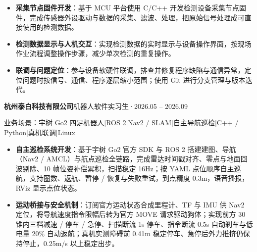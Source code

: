 \documentclass[10pt,a4paper]{article}
\begin{document}
\vspace{2pt}

\begin{itemize}[leftmargin=1.5em, itemsep=1pt, parsep=0pt, topsep=2pt]
    \item \textbf{采集节点固件开发}：基于 MCU 平台使用 C/C++ 开发检测设备采集节点固件，完成传感器外设驱动与数据的采集、滤波、处理，把原始信号处理成可直接使用的检测数据。
    \item \textbf{检测数据显示与人机交互}：实现检测数据的实时显示与设备操作界面，按现场作业流程调整操作步骤，减少单次检测的重复操作。
    \item \textbf{联调与问题定位}：参与设备软硬件联调，排查并修复程序缺陷与通信异常，定位问题时按信号、通信、程序逐层缩小范围；使用 Git 进行分支管理与版本迭代。
\end{itemize}

{\bfseries 杭州泰白科技有限公司}\hfill{\color{graytext}机器人软件实习生\hspace{0.3em}·\hspace{0.3em}2026.05 -- 2026.09}

{\small\color{graytext}业务场景：宇树 Go2 四足机器人\hspace{0.3em}|\hspace{0.3em}ROS 2\hspace{0.3em}|\hspace{0.3em}Nav2 / SLAM\hspace{0.3em}|\hspace{0.3em}自主导航巡检\hspace{0.3em}|\hspace{0.3em}C++ / Python\hspace{0.3em}|\hspace{0.3em}真机联调\hspace{0.3em}|\hspace{0.3em}Linux}

\vspace{2pt}

\begin{itemize}[leftmargin=1.5em, itemsep=0.5pt, parsep=0pt, topsep=2pt]
    \item \textbf{自主巡检系统开发}：基于宇树 Go2 官方 SDK 与 ROS 2 搭建建图、导航（Nav2 / AMCL）与航点巡检全链路，完成雷达时间戳对齐、零点与地面回波剔除、10 帧位姿补偿累积，扫描稳定 16Hz；按 YAML 点位顺序自主巡航，支持圈数、返航、暂停 / 恢复与失败重试，到点精度 0.3m，语音播报，RViz 显示点位状态。
    \item \textbf{运动桥接与安全机制}：订阅官方运动状态合成里程计、TF 与 IMU 供 Nav2 定位，将导航速度指令限幅后转为官方 MOVE 请求驱动狗体；实现前方 30\textdegree{} 锥内三档减速 / 停车 / 急停、扫描断流 1s 停车、指令断流 0.5s 自动刹车与低电量 20\% 自动返航；真机实测障碍前 0.41m 稳定停车、急停后外力推挤仍保持停止，0.25m/s 以上稳定出步。
\end{itemize}
\end{document}
